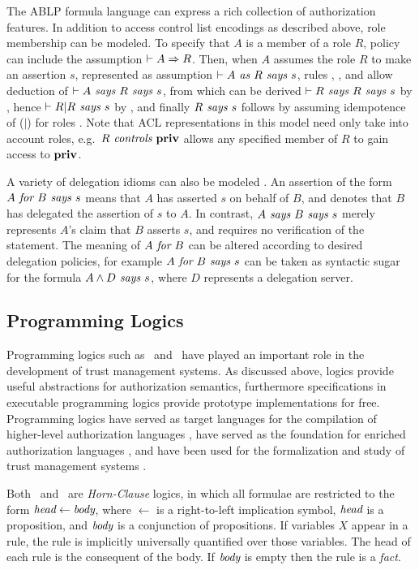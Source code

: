 The ABLP formula language can express a rich collection of authorization
features.  In addition to access control list encodings as described
above, role membership can be modeled.  To specify that $A$ is a
member of a role $R$, policy can include the assumption $\vdash A
\Rightarrow R$.  Then, when $A$ assumes the role $R$ to make an
assertion $s$, represented as assumption $\vdash A \textit{ as } R \textit{ says } s$, rules
, , and  allow deduction of 
$\vdash A \textit{ says } R \textit{ says } s$, from which can be derived $\vdash R \textit{ says }
R \textit{ says } s$ by , hence $\vdash R|R \textit{ says } s$ by
, and finally $R \textit{ says } s$ follows by assuming idempotence 
of ($|$) for roles
\cite{Abadi:CACDS}.  Note that ACL representations in this model need
only take into account roles, e.g.~$R \textit{ controls } \mathbf{priv}$ allows any
specified member of $R$ to gain access to $\mathbf{priv}$.

A variety of delegation idioms can also be modeled
\cite{Abadi:CACDS}.  An assertion of the form $A \textit{ for } B \textit{ says }
s$ means that $A$ has asserted $s$ on behalf of $B$, and denotes that
$B$ has delegated the assertion of $s$ to $A$.  In contrast, $A \textit{ says }
B \textit{ says } s$ merely represents $A$'s claim that $B$ asserts $s$, and
requires no verification of the statement.  The meaning of 
$A \textit{ for } B$ can be altered according to desired delegation policies,
for example $A \textit{ for } B \textit{ says } s$ can be taken as syntactic sugar for
the formula $A \wedge D \textit{ says } s$, where $D$ represents a 
delegation server.

\subsection{Programming Logics}

Programming logics such as \prolog\ and \datalog\ have played an
important role in the development of trust management systems.  As
discussed above, logics provide useful abstractions for authorization
semantics, furthermore specifications in executable programming logics
provide prototype implementations for free.  Programming logics have
served as target languages for the compilation of higher-level
authorization languages \cite{Li:DCFTML,woo93authorizations}, have
served as the foundation for enriched authorization languages
\cite{Li:USSUFOL,Jim:STMSCE,DeTreville:BLBSL,Li:DRBTMF,Li:DLLBADA},
and have been used for the formalization and study of trust management
systems \cite{Li:USSUFOL,polakow-skalka-plas06}.

Both \prolog\ and \datalog\ are \emph{Horn-Clause} logics, in which
all formulae are restricted to the form $\mbox{\it head} \leftarrow
\mbox{\it body}$, where $\leftarrow$ is a right-to-left implication
symbol, $\mbox{\it head}$ is a proposition, and $\mbox{\it body}$ is a
conjunction of propositions.  If variables $X$ appear in a rule, the
rule is implicitly universally quantified over those variables. The
head of each rule is the consequent of the body.  If $\mbox{\it body}$
is empty then the rule is a \emph{fact}.

